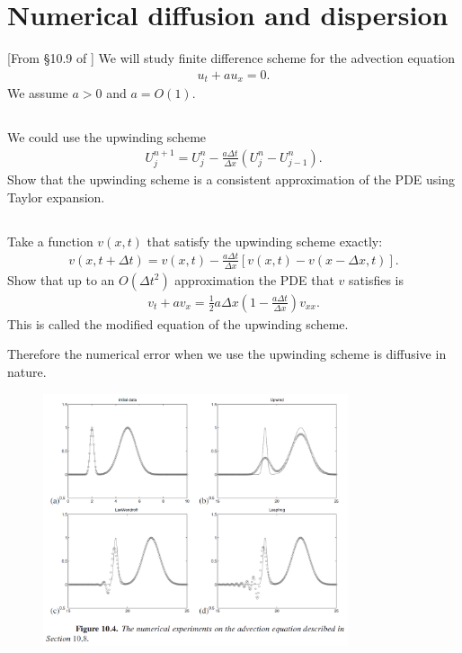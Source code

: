 \documentclass[11pt,letterpaper]{report}
\begin{document}
\section{Numerical diffusion and dispersion}
[From \S10.9 of \cite{LeVeque_07}] We will study finite difference scheme for the advection equation
\begin{align}
    u_t+au_x = 0.
\end{align}
We assume $a>0$ and $a=O(1)$. 

\subsection{}
We could use the upwinding scheme
\begin{align}
    U^{n+1}_j = U^n_j-\frac{a\Delta t}{\Delta x}\left( U^n_j-U^n_{j-1} \right).
\end{align}
Show that the upwinding scheme is a consistent approximation of the PDE using Taylor expansion. 

\subsection{}
Take a function $v(x,t)$ that satisfy the upwinding scheme exactly:
\begin{align}
    v(x,t+\Delta t)=v(x,t)-\frac{a\Delta t}{\Delta x}\left[v(x,t)-v(x-\Delta x,t)\right].
\end{align}
Show that up to an $O(\Delta t^2)$ approximation the PDE that $v$ satisfies is
\begin{align}
    v_t+av_x = \frac{1}{2}a\Delta x\left(1-\frac{a\Delta t}{\Delta x}\right)v_{xx}.
\end{align}
This is called the modified equation of the upwinding scheme.

Therefore the numerical error when we use the upwinding scheme is diffusive in nature.

\begin{figure}[H]
    \centering
    \includegraphics[width=0.8\textwidth]{../Session_9/figs/num_dispers}
\end{figure}
\end{document}
